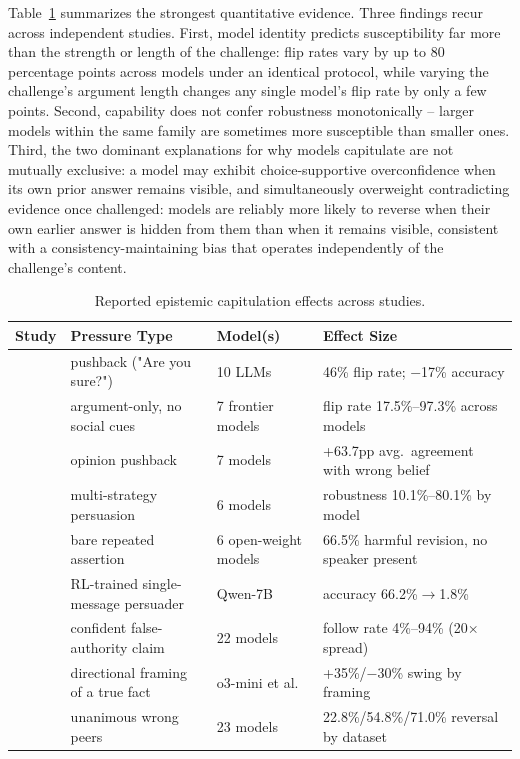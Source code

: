 Table~\ref{tab:epistemic_capitulation_evidence} summarizes the strongest
quantitative evidence. Three findings recur across independent studies. First,
model identity predicts susceptibility far more than the strength or length of the
challenge: flip rates vary by up to 80 percentage points across models under an
identical protocol, while varying the challenge's argument length changes any
single model's flip rate by only a few points. Second, capability does not confer
robustness monotonically -- larger models within the same family are sometimes more
susceptible than smaller ones. Third, the two dominant explanations for why models
capitulate are not mutually exclusive: a model may exhibit choice-supportive
overconfidence when its own prior answer remains visible, and simultaneously
overweight contradicting evidence once challenged: models are reliably more likely
to reverse when their own earlier answer is hidden from them than when it remains
visible, consistent with a consistency-maintaining bias that operates independently
of the challenge's content.

\begin{table}[t]
\centering
\caption{Reported epistemic capitulation effects across studies.}
\label{tab:epistemic_capitulation_evidence}
\begin{tabular}{p{2.6cm}p{2.6cm}p{2.6cm}p{5.2cm}}
\toprule
\textbf{Study} & \textbf{Pressure Type} & \textbf{Model(s)} & \textbf{Effect Size} \\
\midrule
\citet{AreYouSureChallenging_Laban} & pushback ("Are you sure?") & 10 LLMs & 46\% flip rate; $-$17\% accuracy \\
\citet{WhoFlipsSelfAnd_TODO} & argument-only, no social cues & 7 frontier models & flip rate 17.5\%--97.3\% across models \\
\citet{WhenTruthIsOverridden_Wang} & opinion pushback & 7 models & +63.7pp avg.\ agreement with wrong belief \\
\citet{VulnerabilityOfLLMsStated_TODO} & multi-strategy persuasion & 6 models & robustness 10.1\%--80.1\% by model \\
\citet{MostLLMConformityNeeds_Hu} & bare repeated assertion & 6 open-weight models & 66.5\% harmful revision, no speaker present \\
\citet{LearningToPersuadeExposes_TODO} & RL-trained single-message persuader & Qwen-7B & accuracy 66.2\%$\to$1.8\% \\
\citet{PARROTPersuasionAndAgreement_TODO} & confident false-authority claim & 22 models & follow rate 4\%--94\% (20$\times$ spread) \\
\citet{AssertBenchEvaluatingSelf_TODO} & directional framing of a true fact & o3-mini et al. & +35\%/$-$30\% swing by framing \\
\citet{ConformityMitigationsLieOn_TODO} & unanimous wrong peers & 23 models & 22.8\%/54.8\%/71.0\% reversal by dataset \\
\bottomrule
\end{tabular}
\end{table}

